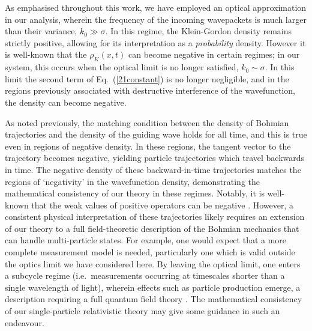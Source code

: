 \documentclass[12pt,prx,
,nofootinbib
,floatfix
,superscriptaddress
]{revtex4-2}
\begin{document}
As emphasised throughout this work, we have employed an optical approximation in our analysis, wherein the frequency of the incoming wavepackets is much larger than their variance, $k_0 \gg \sigma$. In this regime, the Klein-Gordon density remains strictly positive, allowing for its interpretation as a \textit{probability} density. However it is well-known that the $\rho_K(x,t)$ can become negative in certain regimes; in our system, this occurs when the optical limit is no longer satisfied, $k_0 \sim \sigma$. In this limit the second term of Eq.\ (\ref{21constant}) is no longer negligible, and in the regions previously associated with destructive interference of the wavefunction, the density can become negative. 

As noted previously, the matching condition between the density of Bohmian trajectories and the density of the guiding wave holds for all time, and this is true even in regions of negative density. In these regions, the tangent vector to the trajectory becomes negative, yielding particle trajectories which travel backwards in time. The negative density of these backward-in-time trajectories matches the regions of `negativity' in the wavefunction density, demonstrating the mathematical consistency of our theory in these regimes. Notably, it is well-known that the weak values of positive operators can be negative \cite{puseyPhysRevLett.113.200401,Hosoya_2010,sokolovskiPhysRevA.76.042125,johansenPhysRevA.70.052115,aharonovPhysRevA.72.052111}. However, a consistent physical interpretation of these trajectories likely requires an extension of our theory to a full field-theoretic description of the Bohmian mechanics that can handle multi-particle states. For example, one would expect that a more complete measurement model is needed, particularly one which is valid outside the optics limit we have considered here. By leaving the optical limit, one enters a subcycle regime (i.e.\ measurements occurring at timescales shorter than a single wavelength of light), wherein effects such as particle production emerge, a description requiring a full quantum field theory \cite{Riek_2017}. The mathematical consistency of our single-particle relativistic theory may give some guidance in such an endeavour. 
\end{document}
